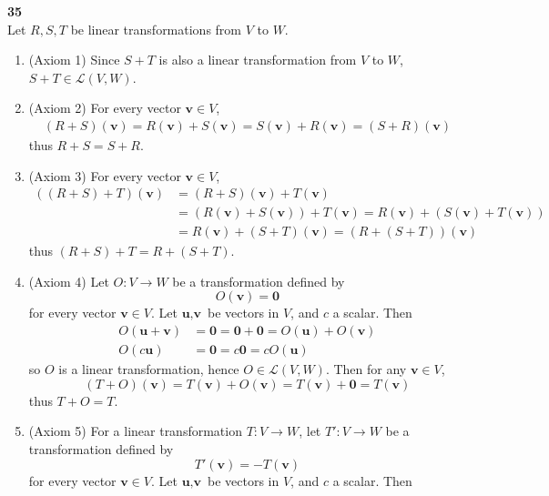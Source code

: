 \textbf{35} \\
Let $R, S, T$ be linear transformations from $V$ to $W$.
\begin{enumerate}
	\item (Axiom 1) Since $S + T$ is also a linear transformation from $V$ to $W$, $S + T \in \mathscr{L}(V, W)$.
	\item (Axiom 2) For every vector $\textbf{v} \in V$, \begin{align*}
		(R + S)(\textbf{v}) = R(\textbf{v}) + S(\textbf{v}) = S(\textbf{v}) + R(\textbf{v}) = (S + R)(\textbf{v})
	\end{align*} thus $R + S = S + R$.
	\item (Axiom 3) For every vector $\textbf{v} \in V$, \begin{align*}
	((R + S) + T)(\textbf{v}) &= (R + S)(\textbf{v}) + T(\textbf{v}) \\
	&= (R(\textbf{v}) + S(\textbf{v})) + T(\textbf{v}) = R(\textbf{v}) + (S(\textbf{v}) + T(\textbf{v})) \\
	&= R(\textbf{v}) + (S + T)(\textbf{v}) = (R + (S + T))(\textbf{v})
	\end{align*} thus $(R + S) + T = R + (S + T)$.
	\item (Axiom 4) Let $O : V \rightarrow W$ be a transformation  defined by \begin{equation*}
		O(\textbf{v}) = \textbf{0}
	\end{equation*} for every vector $\textbf{v} \in V$. Let $\textbf{u}, \textbf{v}$ be vectors in $V$, and $c$ a scalar. Then \begin{align*}
		O(\textbf{u} + \textbf{v}) &= \textbf{0} = \textbf{0} + \textbf{0} = O(\textbf{u}) + O(\textbf{v}) \\
		O(c\textbf{u}) &= \textbf{0} = c\textbf{0} = cO(\textbf{u})
	\end{align*} so $O$ is a linear transformation, hence $O \in \mathscr{L}(V,W)$. Then for any $\textbf{v} \in V$, \begin{equation*}
		(T + O)(\textbf{v}) = T(\textbf{v}) + O(\textbf{v}) = T(\textbf{v}) + \textbf{0} = T(\textbf{v})
	\end{equation*} thus $T + O = T$.
	\item (Axiom 5) For a linear transformation $T: V \rightarrow W$, let $T': V \rightarrow W$ be a transformation defined by \begin{equation*}
		T'(\textbf{v}) = -T(\textbf{v})
	\end{equation*} for every vector $\textbf{v} \in V$. Let $\textbf{u}, \textbf{v}$ be vectors in $V$, and $c$ a scalar. Then \begin{align*}

\end{align*}
\end{enumerate}
